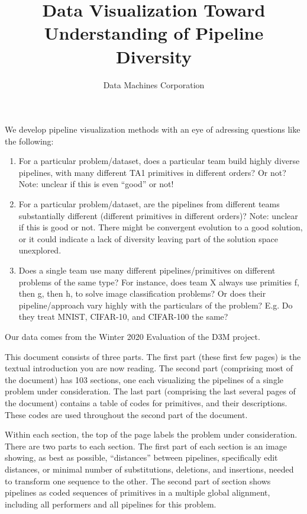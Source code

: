 \documentclass{article}
\title{Data Visualization Toward Understanding of Pipeline Diversity}
\author{Data Machines Corporation}
\begin{document}
\maketitle

We develop pipeline visualization methods with an eye of adressing
questions like the following:

\begin{enumerate}
\item 
  For a particular problem/dataset, does a particular team build
  highly diverse pipelines, with many different TA1 primitives in
  different orders? Or not?  Note: unclear if this is even “good” or
  not!
\item
  For a particular problem/dataset, are the pipelines from different
  teams substantially different (different primitives in different
  orders)?  Note: unclear if this is good or not. There might be
  convergent evolution to a good solution, or it could indicate a lack
  of diversity leaving part of the solution space unexplored.
\item
  Does a single team use many different pipelines/primitives on
  different problems of the same type? For instance, does team X
  always use primities f, then g, then h, to solve image
  classification problems? Or does their pipeline/approach vary highly
  with the particulars of the problem?  E.g. Do they treat MNIST,
  CIFAR-10, and CIFAR-100 the same?
\end{enumerate}

Our data comes from the Winter 2020 Evaluation of the D3M project.

This document consists of three parts.  The first part (these first
few pages) is the textual introduction you are now reading.  The
second part (comprising most of the document) has 103 sections, one
each visualizing the pipelines of a single problem under
consideration.  The last part (comprising the last several pages of
the document) contains a table of codes for primitives, and their
descriptions.  These codes are used throughout the second part of the
document.

Within each section, the top of the page labels the problem under
consideration.  There are two parts to each section.  The first part
of each section is an image showing, as best as possible,
``distances'' between pipelines, specifically edit distances, or
minimal number of substitutions, deletions, and insertions, needed to
transform one sequence to the other.  The second part of section shows
pipelines as coded sequences of primitives in a multiple global
alignment, including all performers and all pipelines for this problem.
\end{document}
